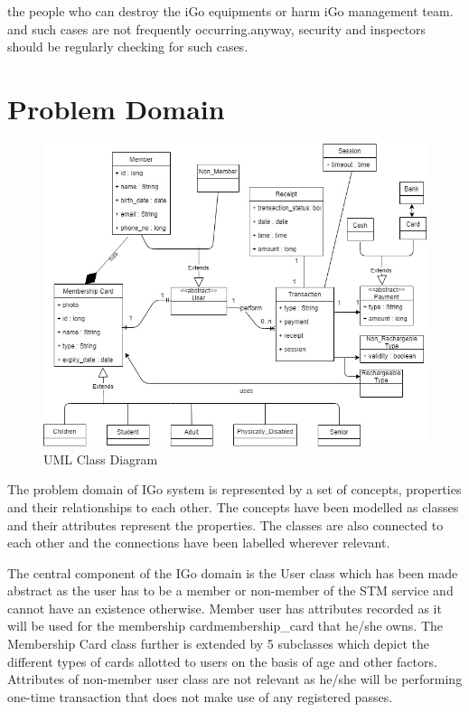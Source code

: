 \documentclass[12pt]{report}
\begin{document}
the people who can destroy the iGo equipments or harm iGo management team. and such cases are not frequently occurring.anyway, security and inspectors should be regularly checking for such cases.\par


\printbibliography





\chapter{Problem Domain}
\begin{figure}[htb]

\begin{center}
\includegraphics[scale=0.54]{./DomainModel}
\end{center}
\caption{UML Class Diagram}
\end{figure}
The problem domain of IGo system is represented by a set of concepts, properties and their relationships to each other. The concepts have been modelled as classes and their attributes represent the properties. The classes are also connected to each other and the connections have been labelled wherever relevant.

The central component of the IGo domain is the User class which has been made abstract as the user has to be a member or non-member of the STM service and cannot have an existence otherwise. Member user has attributes recorded as it will be used for the membership card\gls{membership_card} that he/she owns. The Membership Card class further is extended by 5 subclasses which depict the different types of cards allotted to users on the basis of age and other factors. Attributes of non-member user class are not relevant as he/she will be performing one-time transaction that does not make use of any registered passes.
\end{document}
